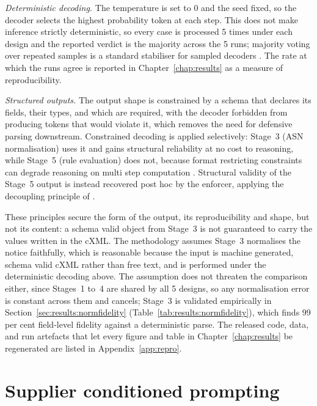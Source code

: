 \emph{Deterministic decoding.} The temperature is set to 0 and the seed fixed, so the decoder selects the highest probability token at each step. This does not make inference strictly deterministic, so every case is processed 5 times under each design and the reported verdict is the majority across the 5 runs; majority voting over repeated samples is a standard stabiliser for sampled decoders \citep{wang2023selfconsistency}. The rate at which the runs agree is reported in Chapter~\ref{chap:results} as a measure of reproducibility.

\emph{Structured outputs.} The output shape is constrained by a schema that declares its fields, their types, and which are required, with the decoder forbidden from producing tokens that would violate it, which removes the need for defensive parsing downstream. Constrained decoding \citep{geng2025} is applied selectively: Stage~3 (ASN normalisation) uses it and gains structural reliability at no cost to reasoning, while Stage~5 (rule evaluation) does not, because format restricting constraints can degrade reasoning on multi step computation \citep{tam2024}. Structural validity of the Stage~5 output is instead recovered post hoc by the enforcer, applying the decoupling principle of \citet{wang2025slot}.

These principles secure the form of the output, its reproducibility and shape, but not its content: a schema valid object from Stage~3 is not guaranteed to carry the values written in the cXML. The methodology assumes Stage~3 normalises the notice faithfully, which is reasonable because the input is machine generated, schema valid cXML rather than free text, and is performed under the deterministic decoding above. The assumption does not threaten the comparison either, since Stages~1 to~4 are shared by all 5 designs, so any normalisation error is constant across them and cancels; Stage~3 is validated empirically in Section~\ref{sec:results:normfidelity} (Table~\ref{tab:results:normfidelity}), which finds 99 per cent field-level fidelity against a deterministic parse. The released code, data, and run artefacts that let every figure and table in Chapter~\ref{chap:results} be regenerated are listed in Appendix~\ref{app:repro}.


\section{Supplier conditioned prompting}
\label{sec:method:supplier}

